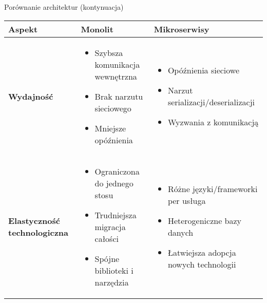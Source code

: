 \documentclass[aspectratio=169,xcolor=table]{beamer}
\begin{document}
\begin{frame}{Porównanie architektur (kontynuacja)}
  \begin{table}
    \footnotesize
    \begin{tabular}{>{\raggedright\arraybackslash}p{2.8cm}|>{\raggedright\arraybackslash}p{3.8cm}|>{\raggedright\arraybackslash}p{3.8cm}}
      \toprule
      \textbf{Aspekt} & \textbf{Monolit} & \textbf{Mikroserwisy} \\
      \midrule
      \textbf{Wydajność} & \begin{itemize}[leftmargin=*]
        \item Szybsza komunikacja wewnętrzna
        \item Brak narzutu sieciowego
        \item Mniejsze opóźnienia
      \end{itemize} & \begin{itemize}[leftmargin=*]
        \item Opóźnienia sieciowe
        \item Narzut serializacji/deserializacji
        \item Wyzwania z komunikacją
       \end{itemize} \\
      \midrule
      \textbf{Elastyczność technologiczna} & \begin{itemize}[leftmargin=*]
        \item Ograniczona do jednego stosu
        \item Trudniejsza migracja całości
        \item Spójne biblioteki i narzędzia
      \end{itemize} & \begin{itemize}[leftmargin=*]
        \item Różne języki/frameworki per usługa
        \item Heterogeniczne bazy danych
        \item Łatwiejsza adopcja nowych technologii
      \end{itemize} \\
      \bottomrule
    \end{tabular}
  \end{table}
\end{frame}
\end{document}
